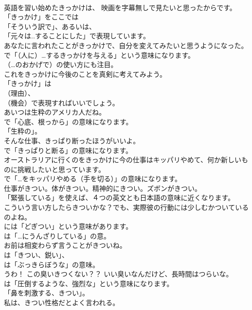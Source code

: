\documentclass[8pt]{extreport}
\begin{document}
\begin{CJK}{UTF8}{min}
\\	英語を習い始めたきっかけは、 映画を字幕無しで見たいと思ったからです。 
\\	「きっかけ」をここでは
\\	「そういう訳で」、あるいは、
\\	「元々は..することにした」で表現しています。	
\\	あなたに言われたことがきっかけで、自分を変えてみたいと思うようになった。 
\\	で「（人に）…するきっかけを与える」という意味になります。
\\	（…のおかげで）の使い方にも注目。	
\\	これをきっかけに今後のことを真剣に考えてみよう。 
\\	「きっかけ」は 
\\	（理由）、
\\	（機会）で表現すればいいでしょう。	
\\	あいつは生粋のアメリカ人だね。 
\\	で「心底、根っから」の意味になります。
\\	「生粋の」。	
\\	そんな仕事、きっぱり断ったほうがいいよ。 
\\	で「きっぱりと断る」の意味になります。	
\\	オーストラリアに行くのをきっかけに今の仕事はキッパリやめて、何か新しいものに挑戦したいと思っています。 
\\	で「…をキッパリやめる（手を切る）」の意味になります。	
\\	仕事がきつい。体がきつい。精神的にきつい。ズボンがきつい。 
\\	「緊張している」を使えば、４つの英文とも日本語の意味に近くなります。	
\\	こういう言い方したらきついかな？でも、実際彼の行動には少しむかついているのよね。 
\\	には「どぎつい」という意味があります。
\\	は「…にうんざりしている」の意。	
\\	お前は相変わらず言うことがきついね。 
\\	は「きつい、鋭い」、
\\	は「ぶっきらぼうな」の意味。	
\\	うわ！ この臭いきつくない？？ いい臭いなんだけど、長時間はつらいな。 
\\	は「圧倒するような、強烈な」という意味になります。
\\	「鼻を刺激する、きつい」。	
\\	私は、きつい性格だとよく言われる。 

\end{CJK}
\end{document}
